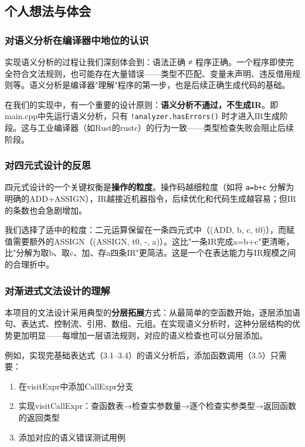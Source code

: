 \documentclass[12pt,a4paper]{ctexart}
\begin{document}
\subsection{个人想法与体会}

\subsubsection{对语义分析在编译器中地位的认识}

实现语义分析的过程让我们深刻体会到：语法正确 ≠ 程序正确。一个程序即使完全符合文法规则，也可能存在大量错误——类型不匹配、变量未声明、违反借用规则等。语义分析是编译器"理解"程序的第一步，也是后续正确生成代码的基础。

在我们的实现中，有一个重要的设计原则：\textbf{语义分析不通过，不生成IR}。即main.cpp中先运行语义分析，只有 \texttt{!analyzer.hasErrors()} 时才进入IR生成阶段。这与工业编译器（如Rust的rustc）的行为一致——类型检查失败会阻止后续阶段。

\subsubsection{对四元式设计的反思}

四元式设计的一个关键权衡是\textbf{操作的粒度}。操作码越细粒度（如将 \texttt{a=b+c} 分解为明确的ADD+ASSIGN），IR越接近机器指令，后续优化和代码生成越容易；但IR的条数也会急剧增加。

我们选择了适中的粒度：二元运算保留在一条四元式中（(ADD, b, c, t0)），而赋值需要额外的ASSIGN（(ASSIGN, t0, -, a)）。这比"一条IR完成a=b+c"更清晰，比"分解为取b、取c、加、存a四条IR"更简洁。这是一个在表达能力与IR规模之间的合理折中。

\subsubsection{对渐进式文法设计的理解}

本项目的文法设计采用典型的\textbf{分层拓展}方式：从最简单的空函数开始，逐层添加语句、表达式、控制流、引用、数组、元组。在实现语义分析时，这种分层结构的优势更加明显——每增加一层语法规则，对应的语义检查也可以分层添加。

例如，实现完基础表达式（3.1--3.4）的语义分析后，添加函数调用（3.5）只需要：
\begin{enumerate}
    \item 在visitExpr中添加CallExpr分支
    \item 实现visitCallExpr：查函数表→检查实参数量→逐个检查实参类型→返回函数的返回类型
    \item 添加对应的语义错误测试用例
\end{enumerate}
\end{document}
